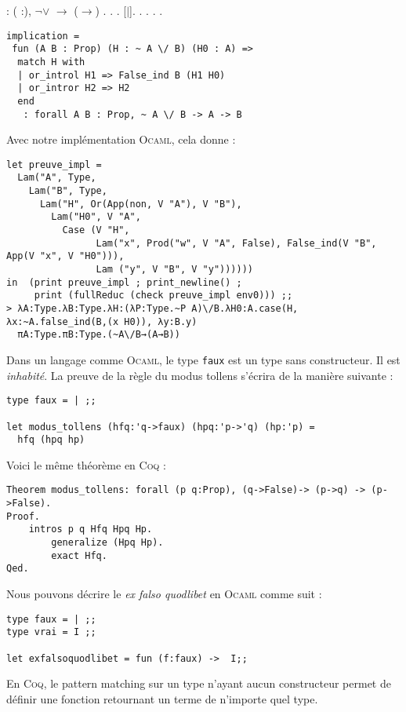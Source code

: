 \begin{coqdoccode}
\coqdocnoindent
{}  : \coqdockw{\ensuremath{\forall}} ( :), \ensuremath{\lnot}\ensuremath{\lor} \ensuremath{\rightarrow} (\ensuremath{\rightarrow}) .\coqdoceol
\coqdocnoindent
{}.\coqdoceol
\coqdocindent{1.00em}
.\coqdoceol
\coqdocindent{1.00em}
   [\ensuremath{|}].\coqdoceol
\coqdocindent{1.00em}
.\coqdoceol
\coqdocindent{1.00em}
.\coqdoceol
\coqdocnoindent
{}.\coqdoceol
\coqdocemptyline
\coqdocnoindent
{} .\coqdoceol
\begin{Verbatim}
implication = 
 fun (A B : Prop) (H : ~ A \/ B) (H0 : A) =>
  match H with
  | or_introl H1 => False_ind B (H1 H0)
  | or_intror H2 => H2
  end
   : forall A B : Prop, ~ A \/ B -> A -> B
\end{Verbatim}
\end{coqdoccode}


Avec notre implémentation \textsc{Ocaml}, cela donne :
\begin{Verbatim}
let preuve_impl =
  Lam("A", Type,
    Lam("B", Type,
      Lam("H", Or(App(non, V "A"), V "B"),
        Lam("H0", V "A",
          Case (V "H", 
                Lam("x", Prod("w", V "A", False), False_ind(V "B", App(V "x", V "H0"))),
                Lam ("y", V "B", V "y")))))) 
in  (print preuve_impl ; print_newline() ;
     print (fullReduc (check preuve_impl env0))) ;;
> λA:Type.λB:Type.λH:(λP:Type.~P A)\/B.λH0:A.case(H, λx:~A.false_ind(B,(x H0)), λy:B.y)
  πA:Type.πB:Type.(~A\/B→(A→B))
\end{Verbatim}

Dans un langage comme \textsc{Ocaml}, le type \verb+faux+ est un type sans constructeur.
Il est \textit{inhabité}. La preuve de la règle du modus tollens s'écrira de la manière suivante :
\begin{Verbatim}
type faux = | ;;

let modus_tollens (hfq:'q->faux) (hpq:'p->'q) (hp:'p) =
  hfq (hpq hp)
\end{Verbatim}
Voici le même théorème en \textsc{Coq} :
\begin{Verbatim}
Theorem modus_tollens: forall (p q:Prop), (q->False)-> (p->q) -> (p->False).
Proof.
	intros p q Hfq Hpq Hp.
        generalize (Hpq Hp).
        exact Hfq.
Qed.
\end{Verbatim}
Nous pouvons décrire le \textit{ex falso quodlibet} en \textsc{Ocaml} comme suit :
\begin{Verbatim}
type faux = | ;;
type vrai = I ;;

let exfalsoquodlibet = fun (f:faux) ->  I;;
\end{Verbatim}
En \textsc{Coq}, le pattern matching sur un type n'ayant aucun constructeur permet de 
définir une fonction retournant un terme de n'importe quel type.


